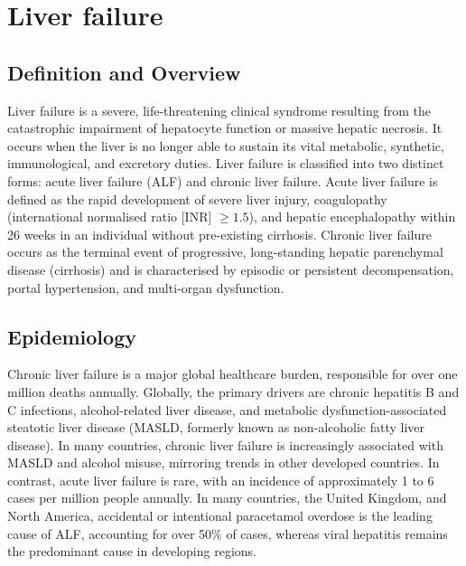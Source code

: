 \chapter{Liver failure}

\section*{Definition and Overview}
Liver failure is a severe, life-threatening clinical syndrome resulting from the catastrophic impairment of hepatocyte function or massive hepatic necrosis. It occurs when the liver is no longer able to sustain its vital metabolic, synthetic, immunological, and excretory duties. Liver failure is classified into two distinct forms: acute liver failure (ALF) and chronic liver failure. Acute liver failure is defined as the rapid development of severe liver injury, coagulopathy (international normalised ratio [INR] $\ge 1.5$), and hepatic encephalopathy within 26 weeks in an individual without pre-existing cirrhosis. Chronic liver failure occurs as the terminal event of progressive, long-standing hepatic parenchymal disease (cirrhosis) and is characterised by episodic or persistent decompensation, portal hypertension, and multi-organ dysfunction.

\section*{Epidemiology}
Chronic liver failure is a major global healthcare burden, responsible for over one million deaths annually. Globally, the primary drivers are chronic hepatitis B and C infections, alcohol-related liver disease, and metabolic dysfunction-associated steatotic liver disease (MASLD, formerly known as non-alcoholic fatty liver disease). In many countries, chronic liver failure is increasingly associated with MASLD and alcohol misuse, mirroring trends in other developed countries. In contrast, acute liver failure is rare, with an incidence of approximately 1 to 6 cases per million people annually. In many countries, the United Kingdom, and North America, accidental or intentional paracetamol overdose is the leading cause of ALF, accounting for over 50\% of cases, whereas viral hepatitis remains the predominant cause in developing regions.

